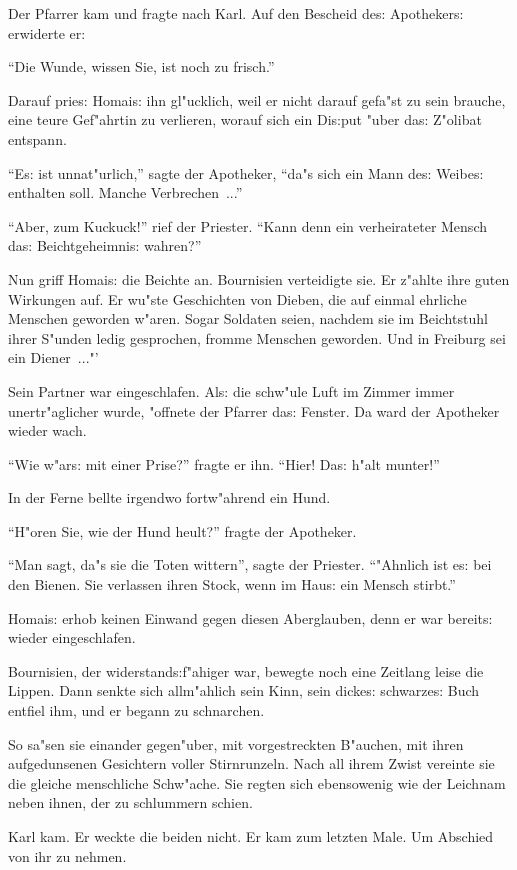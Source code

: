 \documentclass[oneside,12pt]{book}
\newcommand{\s}{s:}%
\begin{document}
Der Pfarrer kam und fragte nach Karl. Auf den Bescheid de{\s}
Apotheker{\s} erwiderte er:

"`Die Wunde, wissen Sie, ist noch zu frisch."'

Darauf prie{\s} Homai{\s} ihn gl"ucklich, weil er nicht darauf
gefa"st zu sein brauche, eine teure Gef"ahrtin zu verlieren,
worauf sich ein Di{\s}put "uber da{\s} Z"olibat entspann.

"`E{\s} ist unnat"urlich,"' sagte der Apotheker, "`da"s sich ein
Mann de{\s} Weibe{\s} enthalten soll. Manche Verbrechen~..."'

"`Aber, zum Kuckuck!"' rief der Priester. "`Kann denn ein
verheirateter Mensch da{\s} Beichtgeheimni{\s} wahren?"'

Nun griff Homai{\s} die Beichte an. Bournisien verteidigte sie. Er
z"ahlte ihre guten Wirkungen auf. Er wu"ste Geschichten von
Dieben, die auf einmal ehrliche Menschen geworden w"aren. Sogar
Soldaten seien, nachdem sie im Beichtstuhl ihrer S"unden ledig
gesprochen, fromme Menschen geworden. Und in Freiburg sei ein
Diener~..."'

Sein Partner war eingeschlafen. Al{\s} die schw"ule Luft im Zimmer
immer unertr"aglicher wurde, "offnete der Pfarrer da{\s} Fenster.
Da ward der Apotheker wieder wach.

"`Wie w"ar{\s} mit einer Prise?"' fragte er ihn. "`Hier! Da{\s}
h"alt munter!"'

In der Ferne bellte irgendwo fortw"ahrend ein Hund.

"`H"oren Sie, wie der Hund heult?"' fragte der Apotheker.

"`Man sagt, da"s sie die Toten wittern"', sagte der Priester.
"`"Ahnlich ist e{\s} bei den Bienen. Sie verlassen ihren Stock,
wenn im Hau{\s} ein Mensch stirbt."'

Homai{\s} erhob keinen Einwand gegen diesen Aberglauben, denn er
war bereit{\s} wieder eingeschlafen.

Bournisien, der widerstand{\s}f"ahiger war, bewegte noch eine
Zeitlang leise die Lippen. Dann senkte sich allm"ahlich sein Kinn,
sein dicke{\s} schwarze{\s} Buch entfiel ihm, und er begann zu
schnarchen.

So sa"sen sie einander gegen"uber, mit vorgestreckten B"auchen,
mit ihren aufgedunsenen Gesichtern voller Stirnrunzeln. Nach all
ihrem Zwist vereinte sie die gleiche menschliche Schw"ache. Sie
regten sich ebensowenig wie der Leichnam neben ihnen, der zu
schlummern schien.

Karl kam. Er weckte die beiden nicht. Er kam zum letzten Male. Um
Abschied von ihr zu nehmen.
\end{document}
